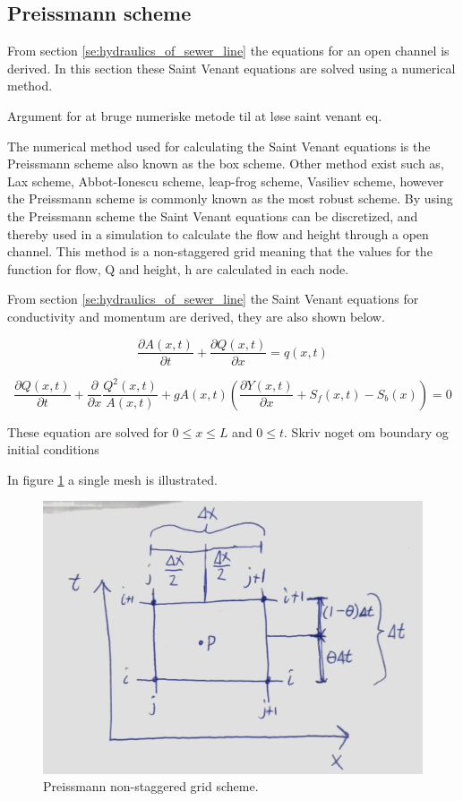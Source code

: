 \subsection{Preissmann scheme}\label{subse:preissmann_scheme}
From section \ref{se:hydraulics_of_sewer_line} the equations for an open channel is derived. In this section these Saint Venant equations are solved using a numerical method. 

Argument for at bruge numeriske metode til at løse saint venant eq.



The numerical method used for calculating the Saint Venant equations is the Preissmann scheme also known as the box scheme. Other method exist such as, Lax scheme, Abbot-Ionescu scheme, leap-frog scheme, Vasiliev scheme, however the Preissmann scheme is commonly known as the most robust scheme. By using the Preissmann scheme the Saint Venant equations can be discretized, and thereby used in a simulation to calculate the flow and height through a open channel. This method is a non-staggered grid meaning that the values for the function for flow, Q and height, h are calculated in each node.  

From section \ref{se:hydraulics_of_sewer_line} the Saint Venant equations for conductivity and momentum are derived, they are also shown below.

\begin{equation}\label{eq:saintbernard_mass_preiss}
\frac{\partial A(x,t)}{\partial t} + \frac{\partial Q(x,t)}{\partial x}=q(x,t)
\end{equation}

\begin{equation}\label{eq:saintbernard_momentum_preiss}
	\frac{\partial Q(x,t)}{\partial t} + \frac{\partial}{\partial x} \frac{Q^2(x,t)}{A(x,t)}+ g A(x,t) (\frac{\partial Y(x,t)}{\partial x} +S_f(x,t)-S_b(x)) = 0
\end{equation}

These equation are solved for $0 \leq x \leq L$ and $0 \leq t$. Skriv noget om boundary og initial conditions



In figure \ref{fig:preissmann_grid_scheme} a single mesh is illustrated.

\begin{figure}[H]
\centering
\includegraphics[width=.6\textwidth]{report/modeling/pictures/preissmann_scheme}
\caption{Preissmann non-staggered grid scheme.}
\label{fig:preissmann_grid_scheme}
\end{figure} 

